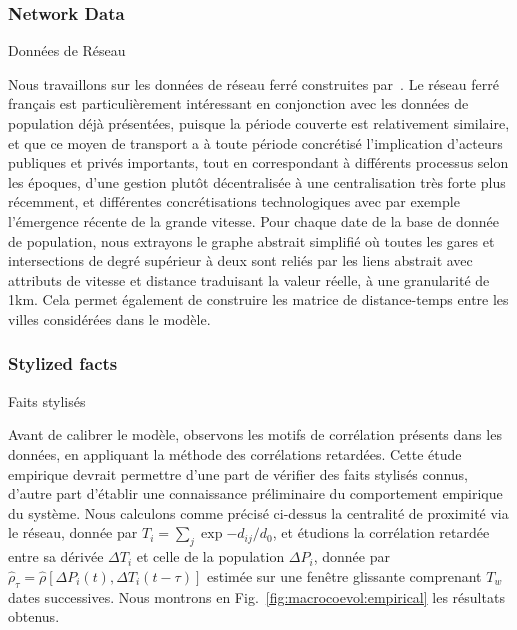\subsubsection{Network Data}{Données de Réseau}

Nous travaillons sur les données de réseau ferré construites par~\cite{thevenin2013mapping}. Le réseau ferré français est particulièrement intéressant en conjonction avec les données de population déjà présentées, puisque la période couverte est relativement similaire, et que ce moyen de transport a à toute période concrétisé l'implication d'acteurs publiques et privés importants, tout en correspondant à différents processus selon les époques, d'une gestion plutôt décentralisée à une centralisation très forte plus récemment, et différentes concrétisations technologiques avec par exemple l'émergence récente de la grande vitesse. Pour chaque date de la base de donnée de population, nous extrayons le graphe abstrait simplifié où toutes les gares et intersections de degré supérieur à deux sont reliés par les liens abstrait avec attributs de vitesse et distance traduisant la valeur réelle, à une granularité de 1km. Cela permet également de construire les matrice de distance-temps entre les villes considérées dans le modèle.





\subsubsection{Stylized facts}{Faits stylisés}


Avant de calibrer le modèle, observons les motifs de corrélation présents dans les données, en appliquant la méthode des corrélations retardées. Cette étude empirique devrait permettre d'une part de vérifier des faits stylisés connus, d'autre part d'établir une connaissance préliminaire du comportement empirique du système. Nous calculons comme précisé ci-dessus la centralité de proximité via le réseau, donnée par $T_i = \sum_j \exp{-d_{ij}/d_0}$, et étudions la corrélation retardée entre sa dérivée $\Delta T_i$ et celle de la population $\Delta P_i$, donnée par $\hat{\rho}_{\tau} = \hat{\rho}\left[\Delta P_i(t),\Delta T_i(t-\tau)\right]$ estimée sur une fenêtre glissante comprenant $T_w$ dates successives. Nous montrons en Fig.~\ref{fig:macrocoevol:empirical} les résultats obtenus.


